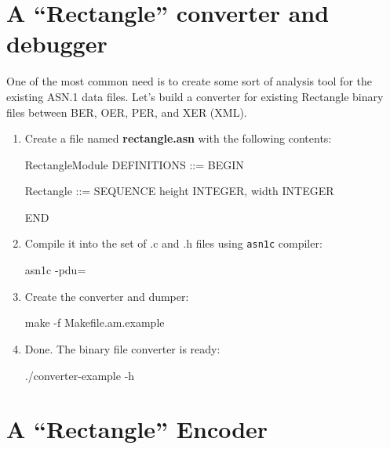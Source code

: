 \documentclass[english,oneside,12pt]{book}
\newcommand{\cmd}[1]{\texttt{#1}}
\begin{document}
\section{A “Rectangle” converter and debugger}

One of the most common need is to create some sort of analysis tool
for the existing ASN.1 data files. Let's build a converter for existing
Rectangle binary files between BER, OER, PER, and XER (XML).

\begin{enumerate}
\item Create a file named \textbf{rectangle.asn} with the following contents:
\begin{asn}
RectangleModule DEFINITIONS ::= BEGIN

Rectangle ::= SEQUENCE {
    height  INTEGER,
    width   INTEGER
}

END
\end{asn}

\item Compile it into the set of .c and .h files using \cmd{asn1c} compiler:

\begin{bash}
asn1c -pdu=%
\end{bash}

\item Create the converter and dumper:

\begin{bash}
make -f Makefile.am.example
\end{bash}

\item Done. The binary file converter is ready:

\begin{bash}
./converter-example -h
\end{bash}
\end{enumerate}

\section{A “Rectangle” Encoder}
\end{document}
